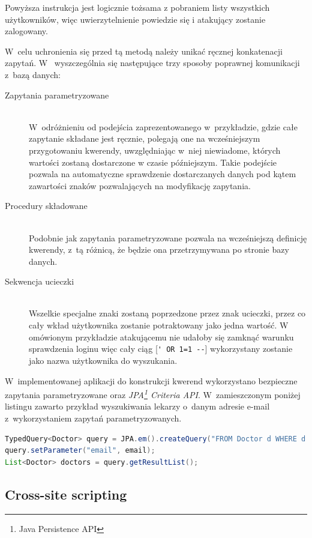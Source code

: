 \documentclass[11pt]{aghdpl}
\begin{document}
Powyższa instrukcja jest logicznie tożsama z pobraniem listy wszystkich użytkowników, więc uwierzytelnienie powiedzie się i atakujący zostanie zalogowany.

W~celu uchronienia się przed tą metodą należy unikać ręcznej konkatenacji zapytań. W~\cite{sql-injection-prevention-cheat-sheet} wyszczególnia się następujące trzy sposoby poprawnej komunikacji z~bazą danych:

\begin{description}
\item[Zapytania parametryzowane] \hfill \\
W~odróżnieniu od podejścia zaprezentowanego w~przykładzie, gdzie całe zapytanie składane jest ręcznie, polegają one na wcześniejszym przygotowaniu kwerendy, uwzględniając w~niej niewiadome, których wartości zostaną dostarczone w czasie późniejszym. Takie podejście pozwala na automatyczne sprawdzenie dostarczanych danych pod kątem zawartości znaków pozwalających na modyfikację zapytania.
\item[Procedury składowane] \hfill \\
Podobnie jak zapytania parametryzowane pozwala na wcześniejszą definicję kwerendy, z~tą różnicą, że będzie ona przetrzymywana po stronie bazy danych.
\item[Sekwencja ucieczki] \hfill \\
Wszelkie specjalne znaki zostaną poprzedzone przez znak ucieczki, przez co cały wkład użytkownika zostanie potraktowany jako jedna wartość. W omówionym przykładzie atakującemu nie udałoby się zamknąć warunku sprawdzenia loginu więc cały ciąg [\lstinline$' OR 1=1 --$] wykorzystany zostanie jako nazwa użytkownika do wyszukania.
\end{description}

W~implementowanej aplikacji do konstrukcji kwerend wykorzystano bezpieczne zapytania parametryzowane oraz \emph{JPA\footnote{Java Persistence API} Criteria API}. W~zamieszczonym poniżej listingu zawarto przykład wyszukiwania lekarzy o~danym adresie e-mail z~wykorzystaniem zapytań parametryzowanych.

\begin{lstlisting}[language=Java]
TypedQuery<Doctor> query = JPA.em().createQuery("FROM Doctor d WHERE d.email=:email", Doctor.class);
query.setParameter("email", email);
List<Doctor> doctors = query.getResultList();
\end{lstlisting}

\subsection{Cross-site scripting}
\end{document}
